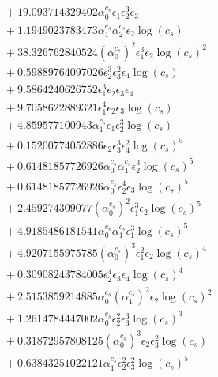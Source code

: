 \documentclass[10pt]{article}
\begin{document}
\begin{align*}
&{}  + 19.093714329402 \alpha_{0}^{c_s} \epsilon_{1} \epsilon_{2}^{3} \epsilon_{3} \\
&{}  + 1.1949023783473 \alpha_{1}^{c_s} \alpha_{2}^{c_s} \epsilon_{2} \log{\left(c_{s} \right)} \\
&{}  + 38.326762840524 \left(\alpha_{0}^{c_s}\right)^{2} \epsilon_{1}^{3} \epsilon_{2} \log{\left(c_{s} \right)}^{2} \\
&{}  + 0.59889764097026 \epsilon_{2}^{3} \epsilon_{3}^{2} \epsilon_{4} \log{\left(c_{s} \right)} \\
&{}  + 9.5864240626752 \epsilon_{1}^{3} \epsilon_{2} \epsilon_{3} \epsilon_{4} \\
&{}  + 9.7058622889321 \epsilon_{1}^{4} \epsilon_{2} \epsilon_{3} \log{\left(c_{s} \right)} \\
&{}  + 4.859577100943 \alpha_{1}^{c_s} \epsilon_{1} \epsilon_{2}^{3} \log{\left(c_{s} \right)} \\
&{}  + 0.15200774052886 \epsilon_{2} \epsilon_{3}^{3} \epsilon_{4}^{2} \log{\left(c_{s} \right)}^{5} \\
&{}  + 0.61481857726926 \alpha_{0}^{c_s} \alpha_{1}^{c_s} \epsilon_{2}^{3} \log{\left(c_{s} \right)}^{5} \\
&{}  + 0.61481857726926 \alpha_{0}^{c_s} \epsilon_{2}^{4} \epsilon_{3} \log{\left(c_{s} \right)}^{5} \\
&{}  + 2.459274309077 \left(\alpha_{0}^{c_s}\right)^{2} \epsilon_{1}^{3} \epsilon_{2} \log{\left(c_{s} \right)}^{5} \\
&{}  + 4.9185486181541 \alpha_{0}^{c_s} \alpha_{1}^{c_s} \epsilon_{1}^{3} \log{\left(c_{s} \right)}^{5} \\
&{}  + 4.9207155975785 \left(\alpha_{0}^{c_s}\right)^{3} \epsilon_{1}^{2} \epsilon_{2} \log{\left(c_{s} \right)}^{4} \\
&{}  + 0.30908243784005 \epsilon_{2}^{4} \epsilon_{3} \epsilon_{4} \log{\left(c_{s} \right)}^{4} \\
&{}  + 2.5153859214885 \alpha_{0}^{c_s} \left(\alpha_{1}^{c_s}\right)^{2} \epsilon_{2} \log{\left(c_{s} \right)}^{2} \\
&{}  + 1.2614784447002 \alpha_{0}^{c_s} \epsilon_{2}^{2} \epsilon_{3}^{3} \log{\left(c_{s} \right)}^{3} \\
&{}  + 0.31872957808125 \left(\alpha_{0}^{c_s}\right)^{3} \epsilon_{2} \epsilon_{3}^{2} \log{\left(c_{s} \right)} \\
&{}  + 0.63843251022121 \alpha_{1}^{c_s} \epsilon_{2}^{2} \epsilon_{3}^{2} \log{\left(c_{s} \right)}^{5} \\

\end{align*}
\end{document}
